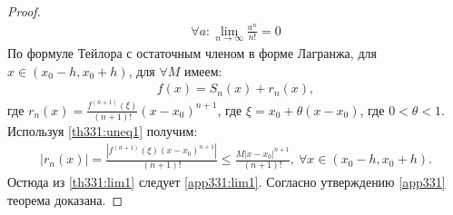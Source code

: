 \begin{proof}
  \begin{gather}
    \forall a : \lim\limits_{n \to \infty} \frac{a^n}{n!} = 0 \label{th331:lim1}
  \end{gather}
  По формуле Тейлора с остаточным членом в форме Лагранжа, для $x \in (x_0 - h,
  x_0 + h)$, для $\forall M$ имеем:
  \begin{gather*}
    f(x) = S_n(x) + r_n(x),
  \end{gather*}
  где $r_n(x) = \frac{f^{(n+1)}(\xi)}{(n+1)!}(x - x_0)^{n+1}$, где $\xi = x_0 +
  \theta(x - x_0)$, где $0 < \theta < 1$. \\
  Используя \eqref{th331:uneq1} получим:
  \begin{gather*}
    |r_n(x)| = \frac{|f^{(n+1)}(\xi) (x - x_0)^{n+1}|}{(n+1)!} \leq
    \frac{M|x-x_0|^{n+1}}{(n+1)!}, \ \forall x \in (x_0 - h, x_0 + h).
  \end{gather*}
  Остюда из \eqref{th331:lim1} следует \eqref{app331:lim1}. Согласно
  утверждению \eqref{app331} теорема доказана.
\end{proof}

